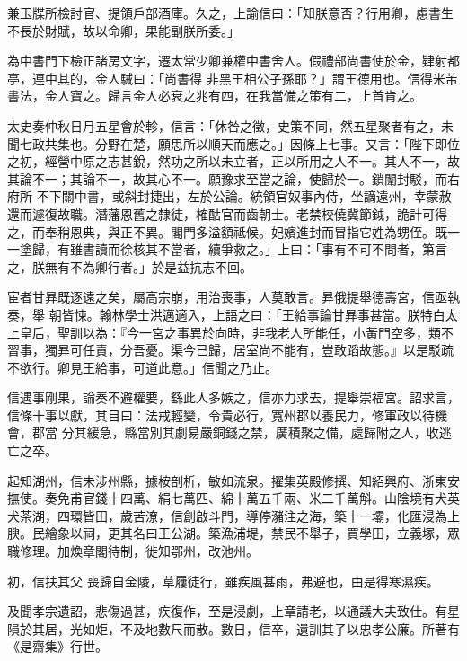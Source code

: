 \begin{pinyinscope}
 兼玉牒所檢討官、提領戶部酒庫。久之，上諭信曰：「知朕意否？行用卿，慮書生不長於財賦，故以命卿，果能副朕所委。」



 為中書門下檢正諸房文字，遷太常少卿兼權中書舍人。假禮部尚書使於金，肄射都亭，連中其的，金人駴曰：「尚書得
 非黑王相公子孫耶？」謂王德用也。信得米芾書法，金人寶之。歸言金人必衰之兆有四，在我當備之策有二，上首肯之。



 太史奏仲秋日月五星會於軫，信言：「休咎之徵，史策不同，然五星聚者有之，未聞七政共集也。分野在楚，願思所以順天而應之。」因條上七事。又言：「陛下即位之初，經營中原之志甚銳，然功之所以未立者，正以所用之人不一。其人不一，故其論不一；其論不一，故其心不一。願豫求至當之論，使歸於一。鎖闈封駁，而右府所
 不下關中書，或斜封捷出，左於公論。統領官奴事內侍，坐謫遠州，幸蒙赦還而遽復故職。潛藩恩舊之隸徒，榷酤官而齒朝士。老禁校僥冀節鉞，詭計可得之，而奉稍恩典，與正不異。閣門多溢額祗候。妃嬪進封而冒指它姓為甥侄。既一一塗歸，有雖書讀而徐核其不當者，續爭救之。」上曰：「事有不可不問者，第言之，朕無有不為卿行者。」於是益抗志不回。



 宦者甘昪既逐遠之矣，屬高宗崩，用治喪事，人莫敢言。昪俄提舉德壽宮，信亟執奏，舉
 朝皆悚。翰林學士洪邁適入，上語之曰：「王給事論甘昪事甚當。朕特白太上皇后，聖訓以為：『今一宮之事異於向時，非我老人所能任，小黃門空多，類不習事，獨昪可任責，分吾憂。渠今已歸，居室尚不能有，豈敢蹈故態。』以是駁疏不欲行。卿見王給事，可道此意。」信聞之乃止。



 信遇事剛果，論奏不避權要，繇此人多嫉之，信亦力求去，提舉崇福宮。詔求言，信條十事以獻，其目曰：法戒輕變，令貴必行，寬州郡以養民力，修軍政以待機會，郡當
 分其緩急，縣當別其劇易嚴銅錢之禁，廣積聚之備，處歸附之人，收逃亡之卒。



 起知湖州，信未涉州縣，據桉剖析，敏如流泉。擢集英殿修撰、知紹興府、浙東安撫使。奏免甫官錢十四萬、絹七萬匹、綿十萬五千兩、米二千萬斛。山陰境有犬英犬茶湖，四環皆田，歲苦潦，信創啟斗門，導停瀦注之海，築十一壩，化匯浸為上腴。民繪象以祠，更其名曰王公湖。築漁浦堤，禁民不舉子，買學田，立義塚，眾職修理。加煥章閣待制，徙知鄂州，改池州。



 初，信扶其父
 喪歸自金陵，草屨徒行，雖疾風甚雨，弗避也，由是得寒濕疾。



 及聞孝宗遺詔，悲傷過甚，疾復作，至是浸劇，上章請老，以通議大夫致仕。有星隕於其居，光如炬，不及地數尺而散。數日，信卒，遺訓其子以忠孝公廉。所著有《是齋集》行世。




\end{pinyinscope}
